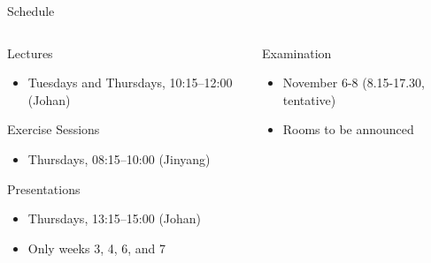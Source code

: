 \documentclass[
  ignorenonframetext,
  aspectratio=1610,
  onlytextwidth]{beamer}
\providecommand{\tightlist}{}
\begin{document}
\begin{frame}{Schedule}
\label{schedule}
\begin{columns}[T]
\begin{column}{0.47\linewidth}
\begin{block}{Lectures}
\label{lectures}
\begin{itemize}[<+->]
\tightlist
\item
  Tuesdays and Thursdays, 10:15--12:00 (Johan)
\end{itemize}

\pause
\end{block}

\begin{block}{Exercise Sessions}
\label{exercise-sessions}
\begin{itemize}[<+->]
\tightlist
\item
  Thursdays, 08:15--10:00 (Jinyang)
\end{itemize}
\end{block}

\begin{block}{Presentations}
\label{presentations-1}
\begin{itemize}[<+->]
\tightlist
\item
  Thursdays, 13:15--15:00 (Johan)
\item
  Only weeks 3, 4, 6, and 7
\end{itemize}
\end{block}
\end{column}

\pause

\begin{column}{0.47\linewidth}
\begin{block}{Examination}
\label{examination-1}
\begin{itemize}[<+->]
\tightlist
\item
  November 6-8 (8.15-17.30, tentative)
\item
  Rooms to be announced
\end{itemize}
\end{block}
\end{column}
\end{columns}
\end{frame}
\end{document}
